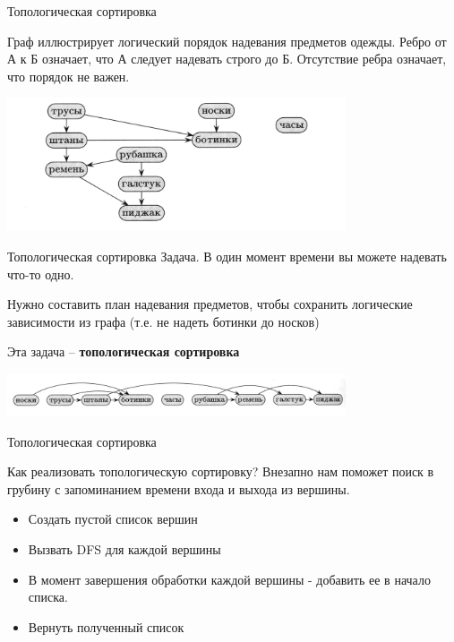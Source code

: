 \documentclass[10pt]{beamer}
\begin{document}
\begin{frame}[fragile]{Топологическая сортировка}

Граф иллюстрирует логический порядок надевания предметов одежды. Ребро от А к Б означает, что А следует надевать строго до Б. Отсутствие ребра означает, что порядок не важен.
\begin{center}
    \includegraphics[width=10cm]{Term_2/Source/images/3_topological-sort-1.png}
\end{center}
\end{frame}


\begin{frame}[fragile]{Топологическая сортировка}
Задача.
В один момент времени вы можете надевать что-то одно. 

Нужно составить план надевания предметов, чтобы сохранить логические зависимости из графа (т.е. не надеть ботинки до носков)

Эта задача -- \textbf{топологическая сортировка}
\begin{center}
    \includegraphics[width=10cm]{Term_2/Source/images/3_topological-sort-2.png}
\end{center}

\end{frame}

\begin{frame}[fragile]{Топологическая сортировка}

Как реализовать топологическую сортировку?
Внезапно нам поможет поиск в грубину с запоминанием времени входа и выхода из вершины.

    \begin{itemize}

        \item Создать пустой список вершин
        \item Вызвать DFS для каждой вершины
        \item В момент завершения обработки каждой вершины - добавить ее в начало списка.
        \item Вернуть полученный список
\end{itemize}

\end{frame}
\end{document}
